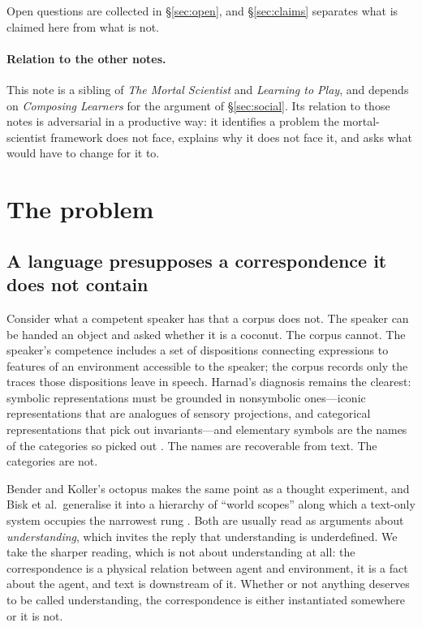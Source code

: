 \documentclass[11pt,a4paper]{article}
\theoremstyle{definition}
\theoremstyle{plain}
\theoremstyle{remark}
\begin{document}
\noindent Open questions are collected in \S\ref{sec:open}, and \S\ref{sec:claims}
separates what is claimed here from what is not.

\paragraph{Relation to the other notes.} This note is a sibling of \emph{The Mortal
Scientist} and \emph{Learning to Play}, and depends on \emph{Composing Learners} for the
argument of \S\ref{sec:social}. Its relation to those notes is adversarial in a
productive way: it identifies a problem the mortal-scientist framework does not face,
explains why it does not face it, and asks what would have to change for it to.

\section{The problem}
\label{sec:problem}

\subsection{A language presupposes a correspondence it does not contain}

Consider what a competent speaker has that a corpus does not. The speaker can be handed
an object and asked whether it is a coconut. The corpus cannot. The speaker's competence
includes a set of dispositions connecting expressions to features of an environment
accessible to the speaker; the corpus records only the traces those dispositions leave in
speech. Harnad's diagnosis remains the clearest: symbolic representations must be
grounded in nonsymbolic ones---iconic representations that are analogues of sensory
projections, and categorical representations that pick out invariants---and elementary
symbols are the names of the categories so picked out \cite{harnad1990}. The names are
recoverable from text. The categories are not.

Bender and Koller's octopus makes the same point as a thought experiment, and Bisk et
al.\ generalise it into a hierarchy of ``world scopes'' along which a text-only system
occupies the narrowest rung \cite{benderkoller2020,bisk2020}. Both are usually read as
arguments about \emph{understanding}, which invites the reply that understanding is
underdefined. We take the sharper reading, which is not about understanding at all: the
correspondence is a physical relation between agent and environment, it is a fact about
the agent, and text is downstream of it. Whether or not anything deserves to be called
understanding, the correspondence is either instantiated somewhere or it is not.
\end{document}
